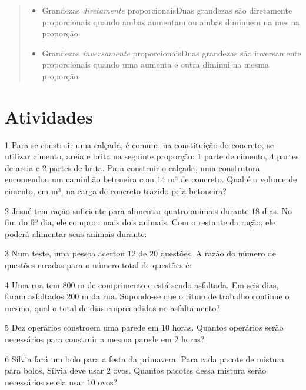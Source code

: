 \begin{quote}
\begin{itemize}
\item Grandezas \textit{diretamente} proporcionais\quad Duas grandezas são diretamente proporcionais quando ambas aumentam ou
ambas diminuem na mesma proporção.
\item Grandezas \textit{inversamente} proporcionais\quad Duas grandezas são inversamente proporcionais quando uma aumenta e outra
diminui na mesma proporção.
\end{itemize}
\end{quote}

\section{Atividades}

\num{1}  Para se construir uma calçada, é comum, na constituição do concreto,
se utilizar cimento, areia e brita na seguinte proporção: $1$ parte de
cimento, $4$ partes de areia e $2$ partes de brita. Para construir o
calçada, uma construtora encomendou um caminhão betoneira com $14$ m³ de
concreto. Qual é o volume de cimento, em m³, na carga de concreto
trazido pela betoneira?


\num{2}  Josué tem ração suficiente para alimentar quatro animais durante $18$
dias. No fim do $6$º dia, ele comprou mais dois animais. Com o restante da
ração, ele poderá alimentar seus animais durante:


\num{3}  Num teste, uma pessoa acertou $12$ de $20$ questões. A razão do número de
questões erradas para o número total de questões é:


\num{4}  Uma rua tem $800$ m de comprimento e está sendo asfaltada. Em seis
dias, foram asfaltados $200$ m da rua. Supondo-se que o ritmo de trabalho
continue o mesmo, qual o total de dias empreendidos no asfaltamento?


\num{5}  Dez operários constroem uma parede em $10$ horas. Quantos operários
serão necessários para construir a mesma parede em $2$ horas?


\num{6}  Sílvia fará um bolo para a festa da primavera. Para cada pacote de
mistura para bolos, Sílvia deve usar $2$ ovos. Quantos pacotes dessa
mistura serão necessários se ela usar $10$ ovos?

